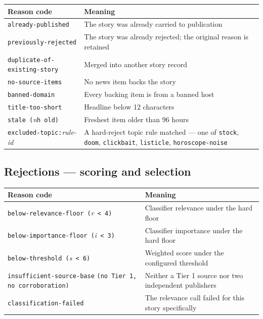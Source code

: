 \documentclass[11pt,a4paper]{article}
\newcommand{\brk}{\hyphenpenalty=0\exhyphenpenalty=0\relax}
\newcommand{\code}[1]{\texttt{\small\brk #1}}
\begin{document}
\begin{center}
\footnotesize
\begin{tabularx}{\textwidth}{@{}>{\RaggedRight}p{5.6cm} >{\RaggedRight}X@{}}
\toprule
\textbf{Reason code} & \textbf{Meaning} \\
\midrule
\code{already-published} & The story was already carried to publication \\
\code{previously-rejected} & The story was already rejected; the original reason is retained \\
\code{duplicate-of-}\allowbreak\code{existing-story} & Merged into another story record \\
\code{no-source-items} & No news item backs the story \\
\code{banned-domain} & Every backing item is from a banned host \\
\code{title-too-short} & Headline below 12 characters \\
\code{stale (}\textit{n}\code{h old)} & Freshest item older than 96 hours \\
\code{excluded-topic:}\textit{rule-id} & A hard-reject topic rule matched --- one of \code{stock}, \code{doom}, \code{clickbait}, \code{listicle}, \code{horoscope-noise} \\
\bottomrule
\end{tabularx}
\end{center}

\subsection{Rejections --- scoring and selection}

\begin{center}
\footnotesize
\begin{tabularx}{\textwidth}{@{}>{\RaggedRight}p{5.6cm} >{\RaggedRight}X@{}}
\toprule
\textbf{Reason code} & \textbf{Meaning} \\
\midrule
\code{below-relevance-floor (}\textit{r}\code{ < 4)} & Classifier relevance under the hard floor \\
\code{below-importance-floor (}\textit{i}\code{ < 3)} & Classifier importance under the hard floor \\
\code{below-threshold (}\textit{s}\code{ < 6)} & Weighted score under the configured threshold \\
\code{insufficient-}\allowbreak\code{source-base} \code{(no Tier 1, no corroboration)} & Neither a Tier 1 source nor two independent publishers \\
\code{classification-failed} & The relevance call failed for this story specifically \\
\bottomrule
\end{tabularx}
\end{center}
\end{document}
